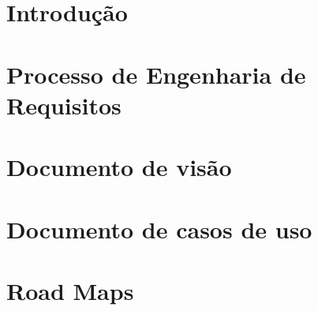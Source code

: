 
\section{Introdução} %
\label{sec:introdu_o}
 
\section{Processo de Engenharia de Requisitos}
\label{sec:processo}


% 

\section{Documento de visão}
\label{sec:document_de_visao}


\section{Documento de casos de uso}
\label{sec:documento_de_caso_de_uso}


\section{Road Maps}
\label{sec:road_map}


%

%
